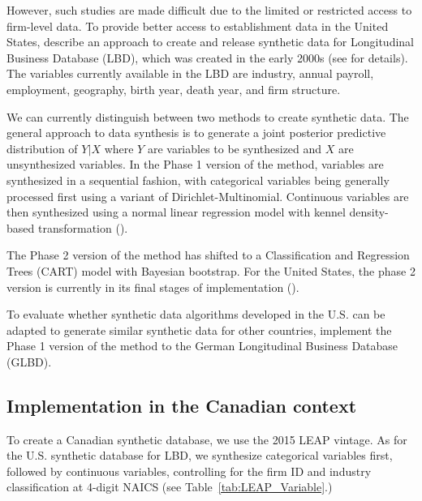 \documentclass{article}
\begin{document}
However, such studies are made difficult due to the limited or restricted access to firm-level data.%
To provide better access to establishment data in the United States, \textcite{RePEc:bla:istatr:v:79:y:2011:i:3:p:362-384} describe an approach to create and release synthetic data for Longitudinal Business Database (LBD), which was created in the early 2000s (see \textcite{RePEc:cen:wpaper:02-17} for details). The variables currently available in the LBD are industry, annual payroll, employment, geography, birth year, death year, and firm structure.    

We can currently distinguish between two methods to create synthetic data. The general approach to data synthesis is to generate a joint posterior predictive distribution of $Y|X$ where $Y$ are variables to be synthesized and $X$ are unsynthesized variables. In the Phase 1 version of the method, variables are synthesized in a sequential fashion, with categorical variables being generally processed first using a variant of Dirichlet-Multinomial. Continuous variables are then synthesized using a normal linear regression model with kennel density-based transformation (\textcite{WOODCOCK20094228}). 

The Phase 2 version of the method has shifted to a Classification and Regression Trees (CART) model with Bayesian bootstrap. For the United States, the phase 2 version  is currently in its final stages of implementation (\textcite{RePEc:cen:wpaper:14-12}). 

To evaluate whether synthetic data algorithms developed in the U.S. can be adapted to generate similar synthetic data for other countries, \textcite{RePEc:cen:wpaper:14-13} implement the Phase 1 version of the method to the German Longitudinal Business Database (GLBD). 

\subsection{Implementation in the Canadian context}

To create a Canadian synthetic database, we use the 2015 LEAP vintage. As for the U.S. synthetic database for LBD, we synthesize categorical variables first, followed by continuous variables, controlling for the firm ID and industry classification at 4-digit NAICS (see Table~\ref{tab:LEAP_Variable}.)
\end{document}
